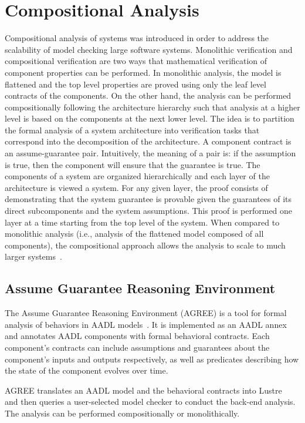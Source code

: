 \section{Compositional Analysis} Compositional analysis of systems was introduced in order to address the scalability of model checking large software systems. Monolithic verification and compositional verification are two ways that mathematical verification of component properties can be performed. In monolithic analysis, the model is flattened and the top level properties are proved using only the leaf level contracts of the components. On the other hand, the analysis can be performed compositionally following the architecture hierarchy such that analysis at a higher level is based on the components at the next lower level. The idea is to partition the formal analysis of a system architecture into verification tasks that correspond into the decomposition of the architecture. A component contract is an assume-guarantee pair. Intuitively, the meaning of a pair is: if the assumption is true, then the component will ensure that the guarantee is true. The components of a system are organized hierarchically and each layer of the architecture is viewed a system. For any given layer, the proof consists of demonstrating that the system guarantee is provable given the guarantees of its direct subcomponents and the system assumptions. This proof is performed one layer at a time starting from the top level of the system. When compared to monolithic analysis (i.e., analysis of the flattened model composed of all components), the compositional approach allows the analysis to scale to much larger systems~\cite{NFM2012:CoGaMiWhLaLu}. 

\subsection{Assume Guarantee Reasoning Environment}
The Assume Guarantee Reasoning Environment (AGREE) is a tool for formal analysis of behaviors in AADL models~\cite{NFM2012:CoGaMiWhLaLu}.  It is implemented as an AADL annex and annotates AADL components with formal behavioral contracts. Each component's contracts can include assumptions and guarantees about the component's inputs and outputs respectively, as well as predicates describing how the state of the component evolves over time.

AGREE translates an AADL model and the behavioral contracts into Lustre~\cite{Halbwachs91:IEEE} and then queries a user-selected model checker to conduct the back-end analysis. The analysis can be performed compositionally or monolithically.

